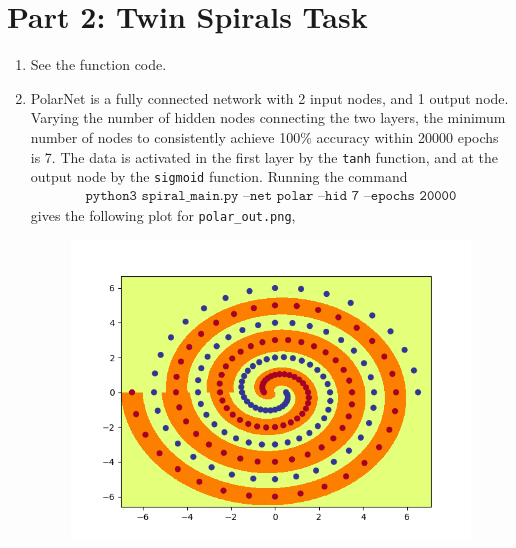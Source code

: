 \documentclass[a4paper,11pt]{article}
\newcommand{\code}{\texttt}
\begin{document}
{{	\section{Part 2: Twin Spirals Task}
	\begin{enumerate}[leftmargin=*]
		\item See the function code.
		\item PolarNet is a fully connected network with 2 input nodes, and 1 output node. Varying the number of hidden nodes connecting the two layers, the minimum number of nodes to consistently achieve 100\% accuracy within 20000 epochs is 7. The data is activated in the first layer by the \code{tanh} function, and at the output node by the \code{sigmoid} function. Running the command
			\begin{align*}
				\code{python3 spiral\_main.py --net polar --hid 7 --epochs 20000}
			\end{align*}
			gives the following plot for \code{polar\_out.png},
			\begin{figure}[!ht]
				\includegraphics[width=\linewidth]{polarout.png}
			\end{figure}


\end{enumerate}}}
\end{document}
